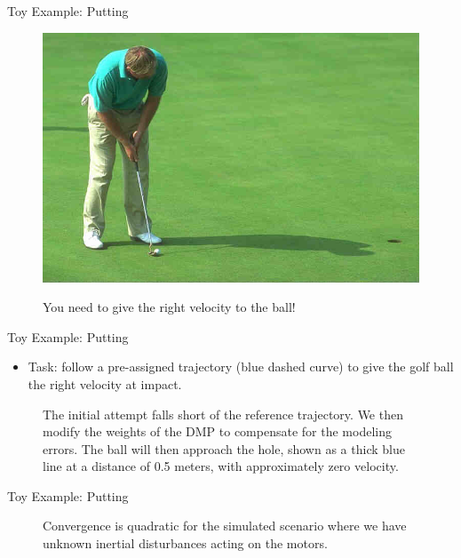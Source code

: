 \documentclass[handout]{beamer}
\begin{document}
%
\begin{frame}{Toy Example: Putting}
\begin{figure}[b!]
\centering
\includegraphics[scale=0.4]{putting.jpg}			
\label{putting}
\caption{You need to give the right velocity to the ball!}
\end{figure}
\end{frame}
%
\begin{frame}{Toy Example: Putting}
\begin{itemize}
\item Task: follow a pre-assigned trajectory (blue dashed curve) to give the golf ball the right velocity at impact.
\end{itemize}
\begin{figure}[ht]
\centering
{}
\caption{The initial attempt falls short of the reference trajectory. We then modify the weights of the DMP to compensate for the modeling errors. The ball will then approach the hole, shown as a thick blue line at a distance of 0.5 meters, with approximately zero velocity.} 
\label{putting1} 
\end{figure}
\end{frame}
%
\begin{frame}{Toy Example: Putting}
\begin{figure}
\centering
\newlength\figureheight 
\newlength\figurewidth 
\setlength\figureheight{6cm}  
\setlength\figurewidth{6cm} 
\scalebox{0.8}{}
\caption{Convergence is quadratic for the simulated scenario where we have unknown inertial disturbances acting on the motors.}
\label{wILCTrajectoryPutting}
\end{figure}
\end{frame}
\end{document}
